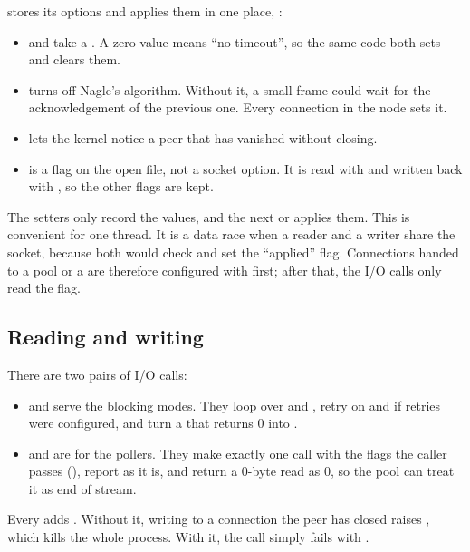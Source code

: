  stores its options and applies them in one place,
:
\begin{itemize}
  \item {} and  take a . A
        zero value means ``no timeout'', so the same code both sets and clears them.
  \item {} turns off Nagle's algorithm. Without it, a small frame
        could wait for the acknowledgement of the previous one. Every connection in
        the node sets it.
  \item {} lets the kernel notice a peer that has vanished without
        closing.
  \item {} is a flag on the open file, not a socket option. It is
        read with  and written back with , so the
        other flags are kept.
\end{itemize}
The  setters only record the values, and the next  or
 applies them. This is convenient for one thread. It is a data race
when a reader and a writer share the socket, because both would check and set the
``applied'' flag. Connections handed to a pool or a  are therefore
configured with  first; after that, the I/O calls only
read the flag.

\subsection{Reading and writing}

There are two pairs of I/O calls:
\begin{itemize}
  \item {} and  serve the blocking modes. They loop over
         and , retry on  and  if
        retries were configured, and turn a  that returns 0 into
        .
  \item {} and  are for the pollers. They make
        exactly one call with the flags the caller passes (),
        report  as it is, and return a 0-byte read as 0, so the pool
        can treat it as end of stream.
\end{itemize}
Every  adds . Without it, writing to a connection the
peer has closed raises , which kills the whole process. With it, the
call simply fails with .

